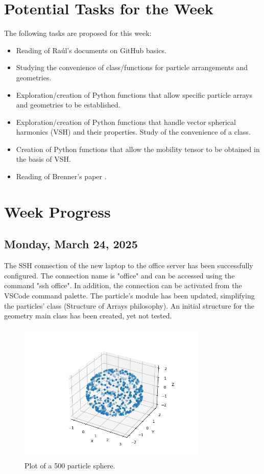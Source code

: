 \documentclass[12pt]{article}
\begin{document}
\section{Potential Tasks for the Week}
The following tasks are proposed for this week:
\begin{itemize}
    \item Reading of Raúl's documents on GitHub basics.
    \item Studying the convenience of class/functions for particle arrangements and geometries.
    \item Exploration/creation of Python functions that allow specific particle arrays and geometries to be established.
    \item Exploration/creation of Python functions that handle vector spherical harmonics (VSH) and their properties. Study of the convenience of a class.
    \item Creation of Python functions that allow the mobility tensor to be obtained in the basis of VSH.
    \item Reading of Brenner's paper \cite{BRENNER1961242}.
\end{itemize}

\section{Week Progress}

\subsection{Monday, March 24, 2025}
The SSH connection of the new laptop to the office server
has been successfully configured. The connection name is
"office" and can be accessed using the command "ssh office".
In addition, the connection can be activated from the VSCode
command palette. The particle's module has been updated,
simplifying the particles' class (Structure of Arrays philosophy).
An initial structure for the geometry main class has been created,
yet not tested.

\begin{figure}[h]
    \centering
    \includegraphics[width=0.8\textwidth]{figures/sphere.png}
    \caption{Plot of a 500 particle sphere.}
    \label{fig:sphere}
\end{figure}
\end{document}
